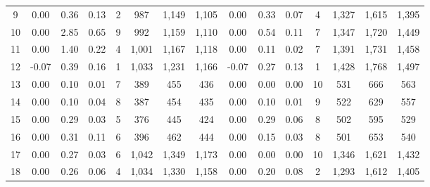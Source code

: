 \documentclass[11pt]{article}
\begin{document}
\begin{table}[H]
\begin{tabular}{ccccccccccccccc}
\multicolumn{1}{c|}{9} & 0.00 & 0.36 & \multicolumn{1}{c|}{0.13} & \multicolumn{1}{c|}{2} & 987 & 1,149 & \multicolumn{1}{c|}{1,105} & 0.00 & 0.33 & \multicolumn{1}{c|}{0.07} & \multicolumn{1}{c|}{4} & 1,327 & 1,615 & 1,395 \\
\multicolumn{1}{c|}{10} & 0.00 & 2.85 & \multicolumn{1}{c|}{0.65} & \multicolumn{1}{c|}{9} & 992 & 1,159 & \multicolumn{1}{c|}{1,110} & 0.00 & 0.54 & \multicolumn{1}{c|}{0.11} & \multicolumn{1}{c|}{7} & 1,347 & 1,720 & 1,449 \\
\multicolumn{1}{c|}{11} & 0.00 & 1.40 & \multicolumn{1}{c|}{0.22} & \multicolumn{1}{c|}{4} & 1,001 & 1,167 & \multicolumn{1}{c|}{1,118} & 0.00 & 0.11 & \multicolumn{1}{c|}{0.02} & \multicolumn{1}{c|}{7} & 1,391 & 1,731 & 1,458 \\
\multicolumn{1}{c|}{12} & -0.07 & 0.39 & \multicolumn{1}{c|}{0.16} & \multicolumn{1}{c|}{1} & 1,033 & 1,231 & \multicolumn{1}{c|}{1,166} & -0.07 & 0.27 & \multicolumn{1}{c|}{0.13} & \multicolumn{1}{c|}{1} & 1,428 & 1,768 & 1,497 \\ \hline
\multicolumn{1}{c|}{13} & 0.00 & 0.10 & \multicolumn{1}{c|}{0.01} & \multicolumn{1}{c|}{7} & 389 & 455 & \multicolumn{1}{c|}{436} & 0.00 & 0.00 & \multicolumn{1}{c|}{0.00} & \multicolumn{1}{c|}{10} & 531 & 666 & 563 \\
\multicolumn{1}{c|}{14} & 0.00 & 0.10 & \multicolumn{1}{c|}{0.04} & \multicolumn{1}{c|}{8} & 387 & 454 & \multicolumn{1}{c|}{435} & 0.00 & 0.10 & \multicolumn{1}{c|}{0.01} & \multicolumn{1}{c|}{9} & 522 & 629 & 557 \\
\multicolumn{1}{c|}{15} & 0.00 & 0.29 & \multicolumn{1}{c|}{0.03} & \multicolumn{1}{c|}{5} & 376 & 445 & \multicolumn{1}{c|}{424} & 0.00 & 0.29 & \multicolumn{1}{c|}{0.06} & \multicolumn{1}{c|}{8} & 502 & 595 & 529 \\
\multicolumn{1}{c|}{16} & 0.00 & 0.31 & \multicolumn{1}{c|}{0.11} & \multicolumn{1}{c|}{6} & 396 & 462 & \multicolumn{1}{c|}{444} & 0.00 & 0.15 & \multicolumn{1}{c|}{0.03} & \multicolumn{1}{c|}{8} & 501 & 653 & 540 \\ \hline
\multicolumn{1}{c|}{17} & 0.00 & 0.27 & \multicolumn{1}{c|}{0.03} & \multicolumn{1}{c|}{6} & 1,042 & 1,349 & \multicolumn{1}{c|}{1,173} & 0.00 & 0.00 & \multicolumn{1}{c|}{0.00} & \multicolumn{1}{c|}{10} & 1,346 & 1,621 & 1,432 \\
\multicolumn{1}{c|}{18} & 0.00 & 0.26 & \multicolumn{1}{c|}{0.06} & \multicolumn{1}{c|}{4} & 1,034 & 1,330 & \multicolumn{1}{c|}{1,158} & 0.00 & 0.20 & \multicolumn{1}{c|}{0.08} & \multicolumn{1}{c|}{2} & 1,293 & 1,612 & 1,405 \\

\end{tabular}
\end{table}
\end{document}
